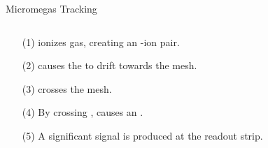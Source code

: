 \begin{frame}{Micromegas Tracking}
    \label{20.07::micromegas_tracking}

    \begin{columns}[onlytextwidth,T]
        \begin{column}{.34\linewidth}
            \begin{enumerate}
                \item[(1)]
                     ionizes gas, creating an -ion pair.

                \vspace{2pt}
                \item[(2)]
                     causes the  to drift towards the mesh.

                \vspace{2pt}
                \item[(3)]
                     crosses the mesh.

                \vspace{2pt}
                \item[(4)]
                    By crossing ,  causes an .

                \vspace{2pt}
                \item[(5)]
                    A significant signal is produced at the readout strip.
            \end{enumerate}
        \end{column}

        \begin{column}{.64\linewidth}
            \vspace{0pt}
            \begin{center}
            \end{center}
        \end{column}
    \end{columns}

\end{frame}
